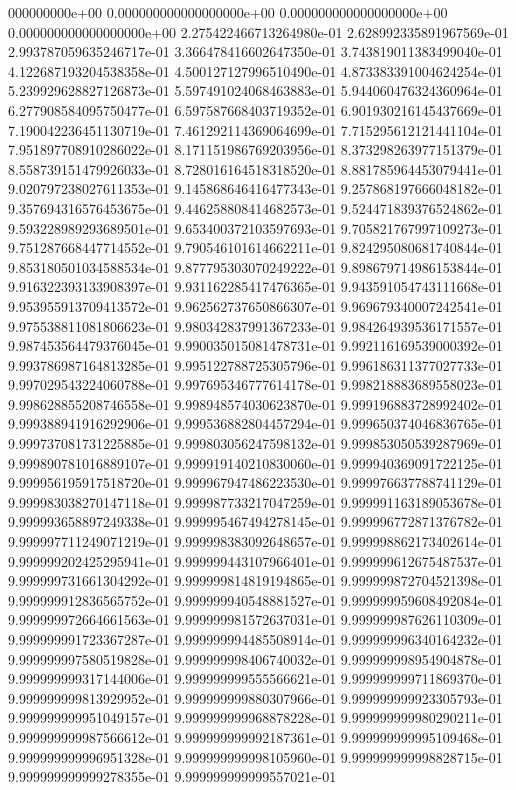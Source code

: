 000000000e+00	0.000000000000000000e+00	0.000000000000000000e+00	0.000000000000000000e+00	2.275422466713264980e-01	2.628992335891967569e-01	2.993787059635246717e-01	3.366478416602647350e-01	3.743819011383499040e-01	4.122687193204538358e-01	4.500127127996510490e-01	4.873383391004624254e-01	5.239929628827126873e-01	5.597491024068463883e-01	5.944060476324360964e-01	6.277908584095750477e-01	6.597587668403719352e-01	6.901930216145437669e-01	7.190042236451130719e-01	7.461292114369064699e-01	7.715295612121441104e-01	7.951897708910286022e-01	8.171151986769203956e-01	8.373298263977151379e-01	8.558739151479926033e-01	8.728016164518318520e-01	8.881785964453079441e-01	9.020797238027611353e-01	9.145868646416477343e-01	9.257868197666048182e-01	9.357694316576453675e-01	9.446258808414682573e-01	9.524471839376524862e-01	9.593228989293689501e-01	9.653400372103597693e-01	9.705821767997109273e-01	9.751287668447714552e-01	9.790546101614662211e-01	9.824295080681740844e-01	9.853180501034588534e-01	9.877795303070249222e-01	9.898679714986153844e-01	9.916322393133908397e-01	9.931162285417476365e-01	9.943591054743111668e-01	9.953955913709413572e-01	9.962562737650866307e-01	9.969679340007242541e-01	9.975538811081806623e-01	9.980342837991367233e-01	9.984264939536171557e-01	9.987453564479376045e-01	9.990035015081478731e-01	9.992116169539000392e-01	9.993786987164813285e-01	9.995122788725305796e-01	9.996186311377027733e-01	9.997029543224060788e-01	9.997695346777614178e-01	9.998218883689558023e-01	9.998628855208746558e-01	9.998948574030623870e-01	9.999196883728992402e-01	9.999388941916292906e-01	9.999536882804457294e-01	9.999650374046836765e-01	9.999737081731225885e-01	9.999803056247598132e-01	9.999853050539287969e-01	9.999890781016889107e-01	9.999919140210830060e-01	9.999940369091722125e-01	9.999956195917518720e-01	9.999967947486223530e-01	9.999976637788741129e-01	9.999983038270147118e-01	9.999987733217047259e-01	9.999991163189053678e-01	9.999993658897249338e-01	9.999995467494278145e-01	9.999996772871376782e-01	9.999997711249071219e-01	9.999998383092648657e-01	9.999998862173402614e-01	9.999999202425295941e-01	9.999999443107966401e-01	9.999999612675487537e-01	9.999999731661304292e-01	9.999999814819194865e-01	9.999999872704521398e-01	9.999999912836565752e-01	9.999999940548881527e-01	9.999999959608492084e-01	9.999999972664661563e-01	9.999999981572637031e-01	9.999999987626110309e-01	9.999999991723367287e-01	9.999999994485508914e-01	9.999999996340164232e-01	9.999999997580519828e-01	9.999999998406740032e-01	9.999999998954904878e-01	9.999999999317144006e-01	9.999999999555566621e-01	9.999999999711869370e-01	9.999999999813929952e-01	9.999999999880307966e-01	9.999999999923305793e-01	9.999999999951049157e-01	9.999999999968878228e-01	9.999999999980290211e-01	9.999999999987566612e-01	9.999999999992187361e-01	9.999999999995109468e-01	9.999999999996951328e-01	9.999999999998105960e-01	9.999999999998828715e-01	9.999999999999278355e-01	9.999999999999557021e-01
